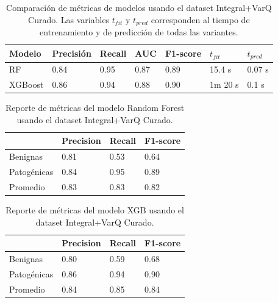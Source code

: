 \begin{table}[H]
\centering
\begin{tabular}{|l|l|l|l|l|l|l|}
\hline
Modelo & Precisión & Recall & AUC & F1-score & $t_{fit}$ & $t_{pred}$ \\ \hline
RF  & 0.84 & 0.95 & 0.87 & 0.89 & 15.4 s & 0.07 s \\ \hline
XGBoost & 0.86 & 0.94 & 0.88 & 0.90 & 1m 20 s & 0.1 s \\ \hline
\end{tabular}

\caption{Comparación de métricas de modelos usando el dataset Integral+VarQ Curado. Las variables $t_{fit}$ y $t_{pred}$ corresponden al tiempo de entrenamiento y de predicción de todas las variantes.}
\label{tab:metrics_model_varq_integral}
\end{table}


\begin{table}[H]
\centering
\begin{tabular}{|l|l|l|l|}
\hline
             & Precision & Recall & F1-score \\ \hline
Benignas     & 0.81      & 0.53   & 0.64     \\ \hline
Patogénicas  & 0.84      & 0.95   & 0.89     \\ \hline
Promedio     & 0.83      & 0.83   & 0.82     \\ \hline
\end{tabular}
\caption{Reporte de métricas del modelo Random Forest usando el dataset Integral+VarQ Curado.}
\label{tab:metrics_integral_varq_rf}
\end{table}


\begin{table}[H]
\centering
\begin{tabular}{|l|l|l|l|}
\hline
             & Precision & Recall & F1-score \\ \hline
Benignas     & 0.80      & 0.59   & 0.68     \\ \hline
Patogénicas  & 0.86      & 0.94   & 0.90     \\ \hline
Promedio     & 0.84      & 0.85   & 0.84     \\ \hline
\end{tabular}
\caption{Reporte de métricas del modelo XGB usando el dataset Integral+VarQ Curado.}
\label{tab:metrics_integral_varq_xgb}
\end{table}


